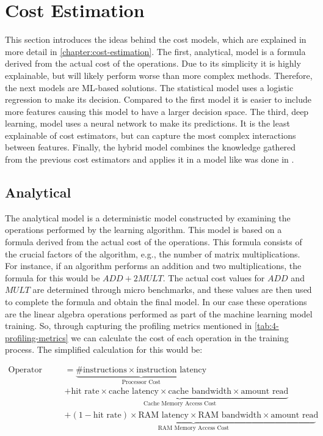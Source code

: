 \section{Cost Estimation}
\label{sec:4-cost-estimation}

This section introduces the ideas behind the cost models, which are explained in more detail in \autoref{chapter:cost-estimation}. The first, analytical, model is a formula derived from the actual cost of the operations. Due to its simplicity it is highly explainable, but will likely perform worse than more complex methods. Therefore, the next models are ML-based solutions. The statistical model uses a logistic regression to make its decision. Compared to the first model it is easier to include more features causing this model to have a larger decision space. The third, deep learning, model uses a neural network to make its predictions. It is the least explainable of cost estimators, but can capture the most complex interactions between features. Finally, the hybrid model combines the knowledge gathered from the previous cost estimators and applies it in a model like was done in \cite{halide_cost_model}.

\subsection{Analytical}
The analytical model is a deterministic model constructed by examining the operations performed by the learning algorithm. This model is based on a formula derived from the actual cost of the operations. This formula consists of the crucial factors of the algorithm, e.g., the number of matrix multiplications. For instance, if an algorithm performs an addition and two multiplications, the formula for this would be $ADD + 2MULT$. The actual cost values for $ADD$ and $MULT$ are determined through micro benchmarks, and these values are then used to complete the formula and obtain the final model. In our case these operations are the linear algebra operations performed as part of the machine learning model training. So, through capturing the profiling metrics mentioned in \autoref{tab:4-profiling-metrics} we can calculate the cost of each operation in the training process. The simplified calculation for this would be:

\vspace{-0.5cm}
\begin{align*}
  \text{{Operator cost}} & =  \underbrace{\# \text{{instructions}} \times \text{{instruction latency}}}_{\text{{Processor Cost}}}                                                         \\
                         & + \underbrace{\text{{hit rate}} \times \text{{cache latency}} \times \text{{cache bandwidth}} \times \text{{amount read}}}_{\text{{Cache Memory Access Cost}}} \\
                         & + \underbrace{(1 - \text{{hit rate}}) \times \text{{RAM latency}} \times \text{{RAM bandwidth}} \times \text{{amount read}}}_{\text{{RAM Memory Access Cost}}}
\end{align*}


